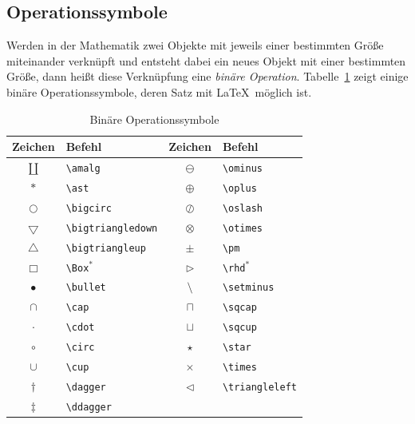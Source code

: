 \documentclass[a4paper,10pt,twoside]{scrbook}
\begin{document}
{\subsection{Operationssymbole}


Werden in der Mathematik zwei Objekte mit jeweils einer bestimmten Größe 
miteinander verknüpft und entsteht dabei ein neues Objekt mit einer bestimmten Größe, dann heißt diese Verknüpfung 
eine \textsl{binäre Operation}. Tabelle~\ref{Tabelle_Binaere_Operationssymbole} zeigt einige 
binäre Operationssymbole, deren Satz mit \LaTeX\ möglich ist.


\begin{table}[h!tb]
\centering
\caption{Binäre Operationssymbole}
\label{Tabelle_Binaere_Operationssymbole}       %
\begin{tabular}{clcl}
\hline
Zeichen & Befehl & Zeichen & Befehl  \\
\hline
$\amalg$ & \texttt{\textbackslash amalg} &
$\ominus$ & \texttt{\textbackslash ominus} \\
$\ast$ & \texttt{\textbackslash ast} &
$\oplus$ & \texttt{\textbackslash oplus} \\
$\bigcirc$ & \texttt{\textbackslash bigcirc} &
$\oslash$ & \texttt{\textbackslash oslash} \\
$\bigtriangledown$ & \texttt{\textbackslash bigtriangledown} &
$\otimes$ & \texttt{\textbackslash otimes} \\
$\bigtriangleup$ & \texttt{\textbackslash bigtriangleup} &
$\pm$ & \texttt{\textbackslash pm} \\
$\Box$ & \texttt{\textbackslash Box$^\ast$} &
$\rhd$ & \texttt{\textbackslash rhd$^\ast$} \\
$\bullet$ & \texttt{\textbackslash bullet} &
$\setminus$ & \texttt{\textbackslash setminus} \\
$\cap$ & \texttt{\textbackslash cap} &
$\sqcap$ & \texttt{\textbackslash sqcap} \\
$\cdot$ & \texttt{\textbackslash cdot} &
$\sqcup$ & \texttt{\textbackslash sqcup} \\
$\circ$ & \texttt{\textbackslash circ} &
$\star$ & \texttt{\textbackslash star} \\
$\cup$ & \texttt{\textbackslash cup} &
$\times$ & \texttt{\textbackslash times} \\
$\dagger$ & \texttt{\textbackslash dagger} &
$\triangleleft$ & \texttt{\textbackslash triangleleft} \\
$\ddagger$ & \texttt{\textbackslash ddagger} &

\end{tabular}
\end{table}}
\end{document}
